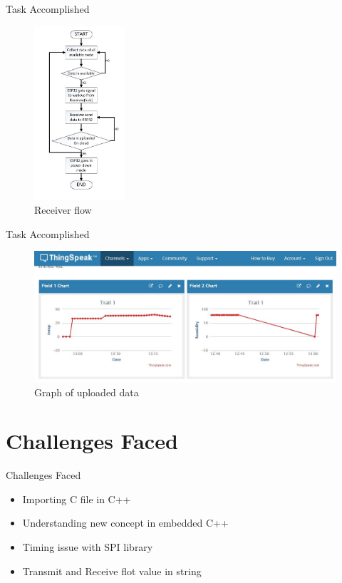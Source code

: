 \documentclass[10pt, a4paper]{beamer}
\begin{document}
\begin{frame}{Task Accomplished}
\begin{figure}
\begin{center}
\includegraphics[width=0.3\textwidth]{receiver_flow_snap.JPG}
\caption{Receiver flow}
\end{center}
\end{figure}
\end {frame}


\begin{frame}{Task Accomplished}
\begin{figure}
\begin{center}
\includegraphics[width=1\textwidth]{graph_thingspeak.JPG}
\caption{Graph of uploaded data}
\end{center}
\end{figure}
\end {frame}


\section{Challenges Faced}
\begin{frame}{Challenges Faced}
	\begin{itemize}
		\item Importing C file in C++
        \item Understanding new concept in embedded C++
        \item Timing issue with SPI library
        \item Transmit and Receive flot value in string 
	\end{itemize} 
\end{frame}
\end{document}

